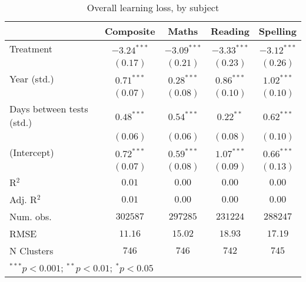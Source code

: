 
\begin{table}
\begin{center}
\begin{tabular}{l c c c c}
\hline
 & Composite & Maths & Reading & Spelling \\
\hline
Treatment                 & $-3.24^{***}$ & $-3.09^{***}$ & $-3.33^{***}$ & $-3.12^{***}$ \\
                          & $(0.17)$      & $(0.21)$      & $(0.23)$      & $(0.26)$      \\
Year (std.)               & $0.71^{***}$  & $0.28^{***}$  & $0.86^{***}$  & $1.02^{***}$  \\
                          & $(0.07)$      & $(0.08)$      & $(0.10)$      & $(0.10)$      \\
Days between tests (std.) & $0.48^{***}$  & $0.54^{***}$  & $0.22^{**}$   & $0.62^{***}$  \\
                          & $(0.06)$      & $(0.06)$      & $(0.08)$      & $(0.10)$      \\
(Intercept)               & $0.72^{***}$  & $0.59^{***}$  & $1.07^{***}$  & $0.66^{***}$  \\
                          & $(0.07)$      & $(0.08)$      & $(0.09)$      & $(0.13)$      \\
\hline
R$^2$                     & $0.01$        & $0.00$        & $0.00$        & $0.00$        \\
Adj. R$^2$                & $0.01$        & $0.00$        & $0.00$        & $0.00$        \\
Num. obs.                 & $302587$      & $297285$      & $231224$      & $288247$      \\
RMSE                      & $11.16$       & $15.02$       & $18.93$       & $17.19$       \\
N Clusters                & $746$         & $746$         & $742$         & $745$         \\
\hline
\multicolumn{5}{l}{\scriptsize{$^{***}p<0.001$; $^{**}p<0.01$; $^{*}p<0.05$}}
\end{tabular}
\caption{Overall learning loss, by subject}
\label{table:overall}
\end{center}
\end{table}
